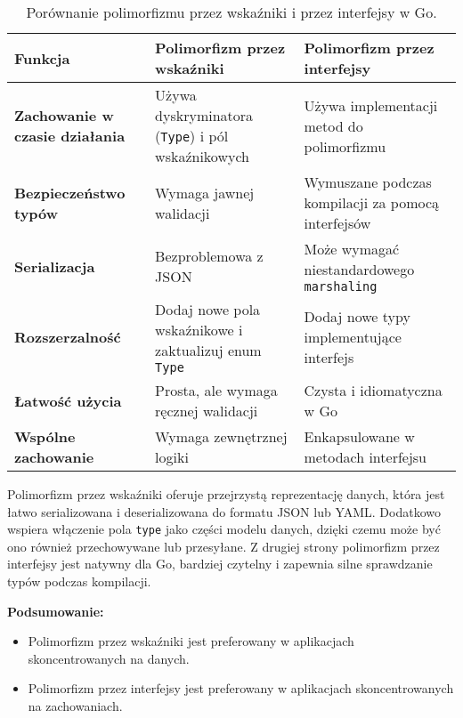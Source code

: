 \begin{table}[h!]
\centering
\renewcommand{\arraystretch}{1.5} %
\begin{tabular}{|p{4cm}|p{5.5cm}|p{5.5cm}|}
\hline
\textbf{Funkcja}               & \textbf{Polimorfizm przez wskaźniki}                                   & \textbf{Polimorfizm przez interfejsy}                          \\ \hline
\textbf{Zachowanie w czasie działania} & Używa dyskryminatora (\texttt{Type}) i pól wskaźnikowych           & Używa implementacji metod do polimorfizmu                     \\ \hline
\textbf{Bezpieczeństwo typów}      & Wymaga jawnej walidacji                                              & Wymuszane podczas kompilacji za pomocą interfejsów            \\ \hline
\textbf{Serializacja}          & Bezproblemowa z JSON                                                 & Może wymagać niestandardowego \texttt{marshaling}             \\ \hline
\textbf{Rozszerzalność}        & Dodaj nowe pola wskaźnikowe i zaktualizuj enum \texttt{Type}          & Dodaj nowe typy implementujące interfejs                      \\ \hline
\textbf{Łatwość użycia}         & Prosta, ale wymaga ręcznej walidacji                                 & Czysta i idiomatyczna w Go                                    \\ \hline
\textbf{Wspólne zachowanie}    & Wymaga zewnętrznej logiki                                            & Enkapsulowane w metodach interfejsu                           \\ \hline
\end{tabular}
\caption{Porównanie polimorfizmu przez wskaźniki i przez interfejsy w Go.}\label{tab:431}
\end{table}

Polimorfizm przez wskaźniki oferuje przejrzystą reprezentację danych, która jest łatwo serializowana i deserializowana do formatu JSON lub YAML. Dodatkowo wspiera włączenie pola \texttt{type} jako części modelu danych, dzięki czemu może być ono również przechowywane lub przesyłane. Z drugiej strony polimorfizm przez interfejsy jest natywny dla Go, bardziej czytelny i zapewnia silne sprawdzanie typów podczas kompilacji.

\textbf{Podsumowanie:}

\begin{itemize}
    \item Polimorfizm przez wskaźniki jest preferowany w aplikacjach skoncentrowanych na danych.
    \item Polimorfizm przez interfejsy jest preferowany w aplikacjach skoncentrowanych na zachowaniach.
\end{itemize}


